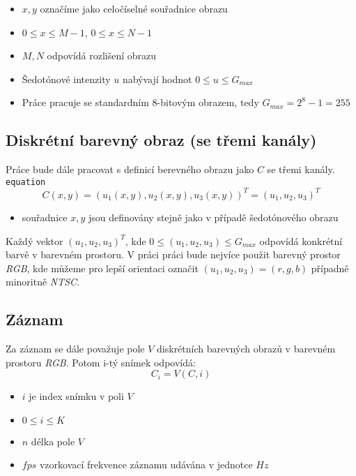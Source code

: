 \documentclass[
  digital, %
  table,   %
%
  lof,     %
  lot,     %
]{fithesis3}
\begin{document}
\begin {itemize}
    \item $x,y$ označíme jako celočíselné souřadnice obrazu
    \item $0 \leq x \leq M-1$, $0 \leq x \leq N-1$
    \item $M, N$ odpovídá rozlišení obrazu
	\item Šedotónové intenzity $u$ nabývají hodnot $0 \leq u \leq G_{max}$
    \item Práce pracuje se standardním 8-bitovým obrazem, tedy  $G_{max} = 2^8 - 1 = 255$
\end {itemize}

\subsection {Diskrétní barevný obraz (se třemi kanály)}
    Práce bude dále pracovat s definicí berevného obrazu jako  $C$ se třemi kanály.
\texttt{equation}
\begin{equation}
	C(x,y) = (u_1(x,y), u_2(x,y), u_3(x,y))^T = (u_1, u_2, u_3)^T
\end{equation}
\begin{itemize}
    \item souřadnice $x,y$ jsou definovány stejně jako v případě šedotónového obrazu
\end{itemize}
	Každý vektor $(u_1, u_2, u_3)^T$, kde $0 \leq (u_1, u_2, u_3) \leq G_{max} $ odpovídá konkrétní barvě v barevném prostoru. V práci práci bude nejvíce použit barevný prostor \emph{RGB}, kde můžeme pro lepší orientaci označit $(u_1, u_2, u_3) = (r,g,b)$ případně minoritně \emph{NTSC}.

\subsection{Záznam}
Za záznam se dále považuje pole $V$ diskrétních barevných obrazů v barevném prostoru \emph{RGB}. Potom i-tý snímek odpovídá:
\begin{equation}
	C_i = V(C,i)
\label{video}
\end{equation}
\begin{itemize}
	\item $i$ je index snímku v poli $V$
    \item $0 \leq i \leq K$
    \item $n$ délka pole $V$
    \item $fps$ vzorkovací frekvence záznamu udávána v jednotce $Hz$
\end{itemize}
\end{document}

